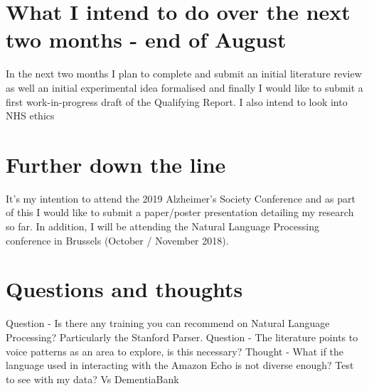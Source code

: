 \documentclass[a4paper]{article}
\begin{document}
\section{What I intend to do over the next two months - end of August}
In the next two months I plan to complete and submit an initial literature review as well an initial experimental idea formalised and finally I would like to submit a first work-in-progress draft of the Qualifying Report. I also intend to look into NHS ethics
\section{Further down the line}
It's my intention to attend the 2019 Alzheimer's Society Conference and as part of this I would like to submit a paper/poster presentation detailing my research so far. In addition, I will be attending the Natural Language Processing conference in Brussels (October / November 2018).

\section{Questions and thoughts}
Question - Is there any training you can recommend on Natural Language Processing? Particularly the Stanford Parser.
\newline
Question - The literature points to voice patterns as an area to explore, is this necessary?
\newline
Thought - What if the language used in interacting with the Amazon Echo is not diverse enough? Test to see with my data? Vs DementiaBank
\newline
\end{document}
